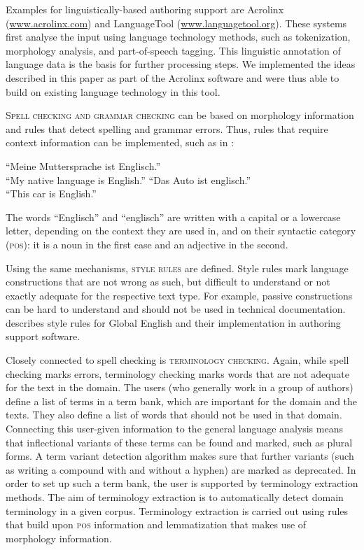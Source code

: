 \documentclass[output=paper]{LSP/langsci}
\begin{document}
Examples for linguistically-based authoring support are Acrolinx (\url{www.acrolinx.com}) and LanguageTool (\url{www.languagetool.org}). These systems first analyse the input using language technology methods, such as tokenization, morphology analysis, and part-of-speech tagging. This linguistic annotation of language data is the basis for further processing steps. We implemented the ideas described in this paper as part of the Acrolinx software and were thus able to build on existing language technology in this tool.

\textsc{Spell checking and grammar checking} can be based on morphology information and rules that detect spelling and grammar errors. Thus, rules that require context information can be implemented, such as in :

\begin{exe}
\label{ex:siegel:1}
\ex
\begin{xlist}
\ex ``Meine Muttersprache ist Englisch.'' \\
 ``My native language is English.''
\ex ``Das Auto ist englisch.'' \\
``This car is English.''
\end{xlist}
\end{exe}

The words ``Englisch'' and ``englisch'' are written with a capital or a lowercase letter, depending on the context they are used in, and on their syntactic category (\textsc{pos}): it is a noun in the first case and an adjective in the second.

Using the same mechanisms, \textsc{style rules} are defined. Style rules mark language constructions that are not wrong as such, but difficult to understand or not exactly adequate for the respective text type. For example, passive constructions can be hard to understand and should not be used in technical documentation. \citet{Kohl2008} describes style rules for Global English and their implementation in authoring support software.

Closely connected to spell checking is \textsc{terminology checking}. Again, while spell checking marks errors, terminology checking marks words that are not adequate for the text in the domain. The users (who generally work in a group of authors) define a list of terms in a term bank, which are important for the domain and the texts. They also define a list of words that should not be used in that domain. Connecting this user-given information to the general language analysis means that inflectional variants of these terms can be found and marked, such as plural forms. A term variant detection algorithm makes sure that further variants (such as writing a compound with and without a hyphen) are marked as deprecated. In order to set up such a term bank, the user is supported by terminology extraction methods. The aim of terminology extraction is to automatically detect domain terminology in a given corpus. Terminology extraction is carried out using rules that build upon \textsc{pos} information and lemmatization that makes use of morphology information.
\end{document}
